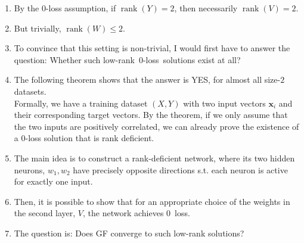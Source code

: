 \documentclass[handout,usenames,dvipsnames]{beamer} %
\DeclareMathOperator{\rank}{rank}
\newcommand{\bx}{\mathbf{x}}
\begin{document}
\begin{frame}
{\begin{enumerate}
            \item By the $0$-loss assumption, if $\rank(Y)=2$, then necessarily $\rank(V)=2$.
            \item But trivially, $\rank(W)\leq 2$.
            \item To convince that this setting is non-trivial, I would first have to answer the question: Whether such low-rank~$0$-loss~solutions exist at all?
            \item The following theorem shows that the answer is YES, for almost all size-$2$ datasets.\\
            Formally, we have a training dataset $(X, Y)$ with two input vectors $\bx_i$ and their corresponding target vectors. By the theorem, if we only assume that the two inputs are positively correlated, we can already prove the existence of a $0$-loss solution that is rank deficient.
            \item The main idea is to construct a rank-deficient network, where its two hidden neurons, $w_1, w_2$ have precisely opposite directions s.t. each neuron is active for exactly one input. 
            \item Then, it is possible to show that for an appropriate choice of the weights in the second layer, $V$, the network achieves $0$~loss.
            \item The question is: Does GF converge to such low-rank solutions?
        \end{enumerate}
    }
\end{frame}
\end{document}
